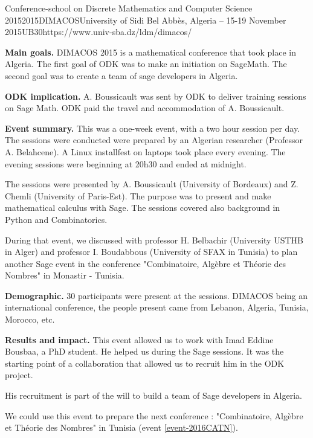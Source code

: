 \begin{event}{Conference-school on Discrete Mathematics and Computer Science 2015}{2015DIMACOS}{University of Sidi Bel Abbès, Algeria -- 15-19 November 2015}{UB}{30}{https://www.univ-sba.dz/ldm/dimacos/}

\textbf{Main goals.} DIMACOS 2015 is a mathematical conference that took place in
Algeria. The first goal of ODK was to make an initiation on SageMath.
The second goal was to create a team of sage developers in Algeria.

\textbf{ODK implication.} A. Boussicault was sent by ODK to deliver
training sessions on
Sage Math. ODK paid the travel and accommodation of A. Boussicault.

\textbf{Event summary.}
This was a one-week event, with a two hour session per day.
The sessions were conducted were prepared by
an Algerian researcher (Professor A. Belahcene).
A Linux installfest on laptops took place every evening.
The evening sessions were beginning at 20h30 and ended at midnight.

The sessions were presented by A. Boussicault (University of Bordeaux) and
Z. Chemli (University of Paris-Est). The purpose was to present and make
mathematical calculus with Sage. The sessions covered also background
in Python and Combinatorics.

During that event, we discussed with professor H. Belbachir
(University USTHB in Alger) and professor I. Boudabbous (University of
SFAX in Tunisia) to plan another Sage event in the conference
"Combinatoire, Algèbre et Théorie des Nombres" in Monastir - Tunisia.


\textbf{Demographic.} 30 participants were present at the sessions.
DIMACOS being an international conference, the people present came from Lebanon, Algeria, Tunisia, Morocco, etc.

\textbf{Results and impact.}
This event allowed us to work with Imad Eddine Bousbaa, a PhD student.
He helped us during the Sage sessions.
It was the starting point of a collaboration that allowed us to recruit him in
the ODK project.

His recruitment is part of the will to build a team of Sage developers in Algeria.

We could use this event to prepare the next conference : "Combinatoire, Algèbre et Théorie des Nombres"
in Tunisia (event \ref{event-2016CATN}).


\end{event}
